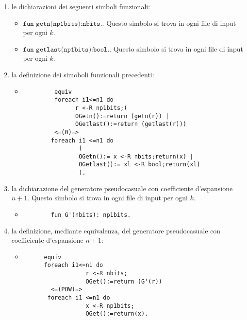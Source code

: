 \documentclass[a4paper,openright,twoside,12pt]{report}
\begin{document}
\begin{enumerate}
\item le dichiarazioni dei seguenti simboli funzionali:
      \begin{itemize}
       \item $\texttt{fun getn(np1bits):nbits.}$. Questo simbolo si trova in ogni file di input per ogni $k$.
       \item $\texttt{fun getlast(np1bits):bool.}$. Questo simbolo si trova in ogni file di input per ogni $k$.
      \end{itemize}		
\item la definizione dei simoboli funzionali precedenti:
      \begin{itemize}
       \item \begin{verbatim}
         equiv
         foreach i1<=n1 do
               r <-R np1bits;(
               OGetn():=return (getn(r)) |
               OGetlast():=return (getlast(r)))
         <=(0)=>
        foreach i1 <=n1 do
                (
                OGetn():= x <-R nbits;return(x) |
                OGetlast():= xl <-R bool;return(xl)
                ).
             \end{verbatim}
      \end{itemize}
\item la dichiarazione del generatore pseudocasuale con coefficiente d'espansione $n+1$. Questo simbolo si trova in ogni file di input per ogni $k$.
\begin{itemize}
 \item \begin{verbatim}
        fun G'(nbits): np1bits.
       \end{verbatim}
\end{itemize}
\item la definizione, mediante equivalenza, del generatore pseudocasuale con coefficiente d'espansione $n+1$:
\begin{itemize}
 \item \begin{verbatim}
      equiv
      foreach i1<=n1 do
                  r <-R nbits;
                  OGet():=return (G'(r))
        <=(POW)=> 
       foreach i1 <=n1 do
                  x <-R np1bits;
                  OGet():=return(x).
       \end{verbatim}
\end{itemize}


\end{enumerate}
\end{document}
